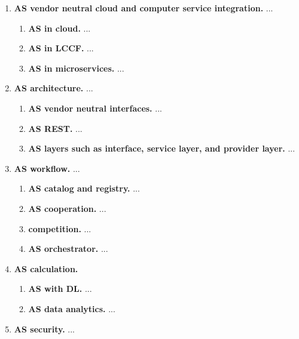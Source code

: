 \begin{enumerate}

\item{\bf AS vendor neutral cloud and computer service integration.} ...

  \begin{enumerate}
  \item {\bf AS in cloud.} ...
  \item {\bf AS in LCCF.} ...
  \item {\bf AS in microservices.} ...
  \end{enumerate}

\item{\bf AS architecture.} ...

  \begin{enumerate}
  \item{\bf AS vendor neutral interfaces.} ...
  \item{\bf AS REST.} ...
  \item{\bf AS layers such as interface, service layer, and provider layer.} ...
  \end{enumerate}

\item{\bf AS workflow.} ...

  \begin{enumerate}
  \item{\bf AS catalog and registry.} ...
  \item{\bf AS cooperation.} ...
  \item{\bf competition.} ...
  \item{\bf AS orchestrator.} ...
  \end{enumerate}


\item{\bf AS calculation.}

  \begin{enumerate}
  \item{\bf AS with DL.} ...
  \item{\bf AS data analytics.} ...
  \end{enumerate}

\item{\bf AS security.} ...

\end{enumerate}